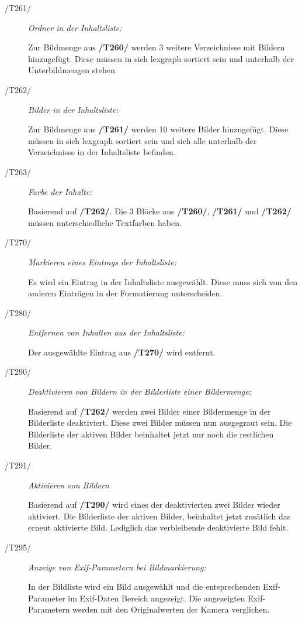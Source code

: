 \begin{description}
			\item[/T261/] \textit{Ordner in der Inhaltsliste:}\par Zur Bildmenge aus \textbf{/T260/} werden 3 weitere Verzeichnisse mit Bildern hinzugefügt. Diese müssen in sich \gls{lexgraph} sortiert sein und unterhalb der Unterbildmengen stehen.
			
			\item[/T262/] \textit{Bilder in der Inhaltsliste:}\par Zur Bildmenge aus \textbf{/T261/} werden 10 weitere Bilder hinzugefügt. Diese müssen in sich \gls{lexgraph} sortiert sein und sich alle unterhalb der Verzeichnisse in der Inhaltsliste befinden.
			
			\item[/T263/] \textit{Farbe der Inhalte:}\par Basierend auf \textbf{/T262/}. Die 3 Blöcke aus \textbf{/T260/}, \textbf{/T261/} und \textbf{/T262/} müssen unterschiedliche Textfarben haben. 
		
			\item[/T270/] \textit{Markieren eines Eintrags der Inhaltsliste:}\par Es wird ein Eintrag in der Inhaltsliste ausgewählt. Diese muss sich von den anderen Einträgen in der Formatierung unterscheiden.
		
			\item[/T280/] \textit{Entfernen von Inhalten aus der Inhaltsliste:}\par Der ausgewählte Eintrag aus \textbf{/T270/} wird entfernt.
		
			\item[/T290/] \textit{Deaktivieren von Bildern in der Bilderliste einer Bildermenge:}\par Basierend auf \textbf{/T262/} werden zwei Bilder einer Bildermenge in der Bilderliste deaktiviert. Diese zwei Bilder müssen nun ausgegraut sein. Die Bilderliste der aktiven Bilder beinhaltet jetzt nur noch die restlichen Bilder.
			
			\item[/T291/] \textit{Aktivieren von Bildern}\par Basierend auf \textbf{/T290/} wird eines der deaktivierten zwei Bilder wieder aktiviert. Die Bilderliste der aktiven Bilder, beinhaltet jetzt zusätlich das erneut aktivierte Bild. Lediglich das verbleibende deaktivierte Bild fehlt.
			
			\item[/T295/] \textit{Anzeige von Exif-Parametern bei Bildmarkierung:}\par In der Bildliste wird ein Bild ausgewählt und die entsprechenden Exif-Parameter im Exif-Daten Bereich angezeigt. Die angezeigten Exif-Parametern werden mit den Originalwerten der Kamera verglichen.
			
		\end{description}
	
